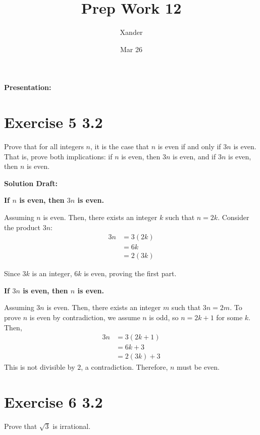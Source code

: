 \documentclass{article}
\title{Prep Work 12}
\author{Xander}
\date{Mar 26}
\begin{document}
\maketitle
\noindent\textbf{Presentation: } 

\section*{Exercise 5 3.2}  

Prove that for all integers \(n\), it is the case that \(n\) is  even if and only if \(3n\) is even.  That is, prove both implications: if \(n\) is even, then \(3n\) is even, and if \(3n\) is even, then \(n\) is even.

\vspace{0.5cm}
\noindent\textbf{Solution Draft:} 
\vspace{0.2cm}

\textbf{If \(n\) is even, then \(3n\) is even.}


Assuming \(n\) is even. Then, there exists an integer \(k\) such that \(n = 2k\). Consider the product \(3n\):
\begin{align*}
    3n &= 3(2k) \\
    &= 6k \\
    &= 2(3k)
    \end{align*}
    
Since \(3k\) is an integer, \(6k\) is even, proving the first part.
\vspace{0.2cm}

\textbf{If \(3n\) is even, then \(n\) is even.}


Assuming \(3n\) is even. Then, there exists an integer \(m\) such that \(3n = 2m\). To prove \(n\) is even by contradiction, we assume \(n\) is odd, so \(n = 2k + 1\) for some \(k\). Then, 
\begin{align*}
    3n &= 3(2k + 1) \\
    &= 6k + 3 \\
    &= 2(3k) + 3
    \end{align*}    
This is not divisible by \(2\), a contradiction. Therefore, \(n\) must be even.


\section*{Exercise 6 3.2}  

Prove that \(\sqrt 3\) is irrational.
\end{document}
